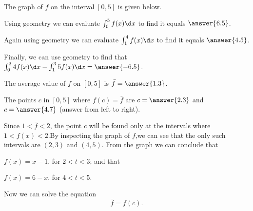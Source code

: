 \documentclass{ximera}
\author{Nela Lakos \and Kyle Parsons}
\begin{document}
\begin{exercise}

The graph of $f$ on the interval $[0,5]$ is given below.

\begin{image}
\end{image}

Using geometry we can evaluate $\int_0^5 f(x) \d x$ to find it equals $\answer{6.5}$.

Again using geometry we can evaluate $\int_1^4 f(x) \d x$ to find it equals $\answer{4.5}$.

Finally, we can use geometry to find that $\int_0^2 4f(x) \d x - \int_1^3 5f(x) \d x = \answer{-6.5}$.

The average value of $f$ on $[0,5]$ is $\bar{f} = \answer{1.3}$.

The points $c$ in $[0,5]$ where $f(c) = \bar{f}$ are $c=\answer{2.3}$ and $c=\answer{4.7}$ (answer from left to right).
\begin{hint}
Since $1<\bar{f}<2$, the point $c$ will be found only at the intervals where $1<f(x)<2$.By inspecting the graph of $f$,we can see that the only such intervals  are $(2,3)$ and $(4,5)$.
From the graph we can conclude that

 $f(x)=x-1$, for  $2<t<3$; and that
 
 $f(x)=6-x$, for $4<t<5$.

Now we can solve the equation
\[
\bar{f} =f(c).
\]
\end{hint}
\end{exercise}
\end{document}
